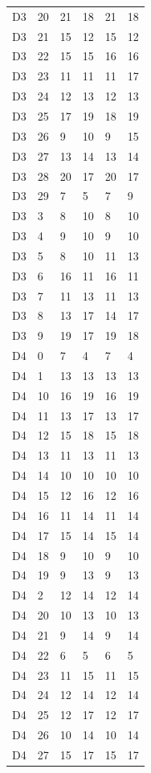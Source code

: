 \begin{longtable}{llllll}
D3 & 20 & 21 & 18 & 21 & 18 \\
D3 & 21 & 15 & 12 & 15 & 12 \\
D3 & 22 & 15 & 15 & 16 & 16 \\
D3 & 23 & 11 & 11 & 11 & 17 \\
D3 & 24 & 12 & 13 & 12 & 13 \\
D3 & 25 & 17 & 19 & 18 & 19 \\
D3 & 26 & 9 & 10 & 9 & 15 \\
D3 & 27 & 13 & 14 & 13 & 14 \\
D3 & 28 & 20 & 17 & 20 & 17 \\
D3 & 29 & 7 & 5 & 7 & 9 \\
D3 & 3 & 8 & 10 & 8 & 10 \\
D3 & 4 & 9 & 10 & 9 & 10 \\
D3 & 5 & 8 & 10 & 11 & 13 \\
D3 & 6 & 16 & 11 & 16 & 11 \\
D3 & 7 & 11 & 13 & 11 & 13 \\
D3 & 8 & 13 & 17 & 14 & 17 \\
D3 & 9 & 19 & 17 & 19 & 18 \\
D4 & 0 & 7 & 4 & 7 & 4 \\
D4 & 1 & 13 & 13 & 13 & 13 \\
D4 & 10 & 16 & 19 & 16 & 19 \\
D4 & 11 & 13 & 17 & 13 & 17 \\
D4 & 12 & 15 & 18 & 15 & 18 \\
D4 & 13 & 11 & 13 & 11 & 13 \\
D4 & 14 & 10 & 10 & 10 & 10 \\
D4 & 15 & 12 & 16 & 12 & 16 \\
D4 & 16 & 11 & 14 & 11 & 14 \\
D4 & 17 & 15 & 14 & 15 & 14 \\
D4 & 18 & 9 & 10 & 9 & 10 \\
D4 & 19 & 9 & 13 & 9 & 13 \\
D4 & 2 & 12 & 14 & 12 & 14 \\
D4 & 20 & 10 & 13 & 10 & 13 \\
D4 & 21 & 9 & 14 & 9 & 14 \\
D4 & 22 & 6 & 5 & 6 & 5 \\
D4 & 23 & 11 & 15 & 11 & 15 \\
D4 & 24 & 12 & 14 & 12 & 14 \\
D4 & 25 & 12 & 17 & 12 & 17 \\
D4 & 26 & 10 & 14 & 10 & 14 \\
D4 & 27 & 15 & 17 & 15 & 17 \\

\end{longtable}
